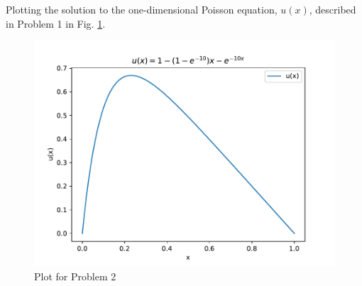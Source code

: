 Plotting the solution to the one-dimensional Poisson equation, \(u(x)\), described in Problem 1 in Fig. \ref{fig:task2_plot}.

\begin{figure}
    \centering
    \includegraphics[width=0.5\linewidth]{project_1/text/plot_t2.pdf}
    \caption{Plot for Problem 2}
    \label{fig:task2_plot}
\end{figure}
